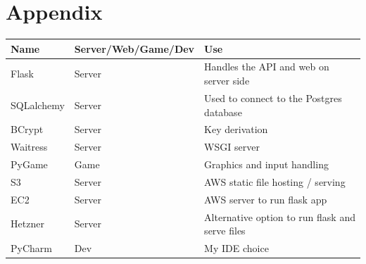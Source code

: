 \documentclass{article}
\begin{document}
\section{Appendix}
\begin{table}[h!]
\begin{tabular}{|l|l|l|}
\hline
\rowcolor[HTML]{C0C0C0} 
{\color[HTML]{000000} \textbf{Name}} & {\color[HTML]{000000} \textbf{Server/Web/Game/Dev}} & {\color[HTML]{000000} \textbf{Use}}             \\ \hline
Flask                                & Server                                              & Handles the API and web on server side          \\ \hline
SQLalchemy                           & Server                                              & Used to connect to the Postgres database        \\ \hline
BCrypt                               & Server                                              & Key derivation                                  \\ \hline
Waitress                             & Server                                              & WSGI server                                     \\ \hline
PyGame                               & Game                                                & Graphics and input handling                     \\ \hline
S3                                   & Server                                              & AWS static file hosting / serving               \\ \hline
EC2                                  & Server                                              & AWS server to run flask app                     \\ \hline
Hetzner                              & Server                                              & Alternative option to run flask and serve files \\ \hline
PyCharm                              & Dev                                                 & My IDE choice                                   \\ \hline
\end{tabular}
\end{table}
\end{document}
